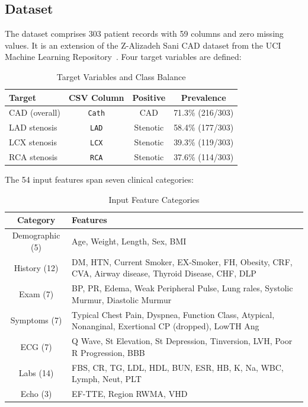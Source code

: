 \documentclass[conference]{IEEEtran}
\begin{document}
\subsection{Dataset}

The dataset comprises 303 patient records with 59 columns and zero missing values. It is an extension of the Z-Alizadeh Sani CAD dataset from the UCI Machine Learning Repository~\cite{alizadeh2018}. Four target variables are defined:

\begin{table}[htbp]
\centering
\caption{Target Variables and Class Balance}
\label{tab:targets}
\footnotesize
\setlength{\tabcolsep}{3.5pt}
\begin{tabular}{lccc}
\toprule
\textbf{Target} & \textbf{CSV Column} & \textbf{Positive} & \textbf{Prevalence} \\
\midrule
CAD (overall) & \texttt{Cath} & CAD & 71.3\% (216/303) \\
LAD stenosis & \texttt{LAD} & Stenotic & 58.4\% (177/303) \\
LCX stenosis & \texttt{LCX} & Stenotic & 39.3\% (119/303) \\
RCA stenosis & \texttt{RCA} & Stenotic & 37.6\% (114/303) \\
\bottomrule
\end{tabular}
\end{table}

The 54 input features span seven clinical categories:

\begin{table}[htbp]
\centering
\caption{Input Feature Categories}
\label{tab:features}
\footnotesize
\setlength{\tabcolsep}{4pt}
\begin{tabular}{cp{2.25in}}
\toprule
\textbf{Category} & \textbf{Features} \\
\midrule
Demographic (5) & Age, Weight, Length, Sex, BMI \\
History (12) & DM, HTN, Current Smoker, EX-Smoker, FH, Obesity, CRF, CVA, Airway disease, Thyroid Disease, CHF, DLP \\
Exam (7) & BP, PR, Edema, Weak Peripheral Pulse, Lung rales, Systolic Murmur, Diastolic Murmur \\
Symptoms (7) & Typical Chest Pain, Dyspnea, Function Class, Atypical, Nonanginal, Exertional CP (dropped), LowTH Ang \\
ECG (7) & Q Wave, St Elevation, St Depression, Tinversion, LVH, Poor R Progression, BBB \\
Labs (14) & FBS, CR, TG, LDL, HDL, BUN, ESR, HB, K, Na, WBC, Lymph, Neut, PLT \\
Echo (3) & EF-TTE, Region RWMA, VHD \\
\bottomrule
\end{tabular}
\end{table}
\end{document}
